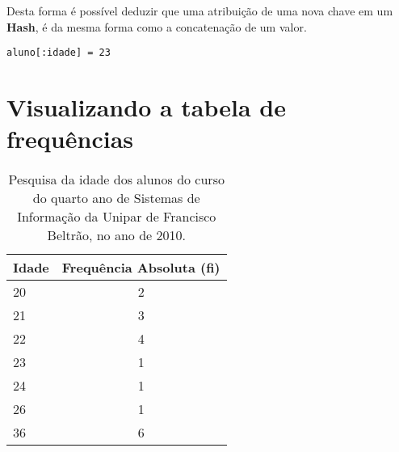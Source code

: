 \documentclass[espaco=simples,appendix=Name]{abnt}
\begin{document}
Desta forma é possível deduzir que uma atribuição de uma nova chave em um \textbf{Hash}, é da mesma forma como a concatenação de um valor.

\begin{lstlisting}[caption=Atribuindo o valor 23 para a chave :idade da variável aluno]
aluno[:idade] = 23 
\end{lstlisting}

\section { Visualizando a tabela de frequências }

\begin{table}
\begin{tabular}{|l|c} 
\hline 
Idade & Frequência Absoluta (\textbf{fi}) \\ \hline 
20 & 2 \\
21 & 3 \\
22 & 4 \\
23 & 1 \\
24 & 1 \\
26 & 1 \\
36 & 6 \\
\hline 
\end{tabular}
\caption{Pesquisa da idade dos alunos do curso do quarto ano de Sistemas de Informação da Unipar de Francisco Beltrão, no ano de 2010.}
\end{table}
\end{document}
